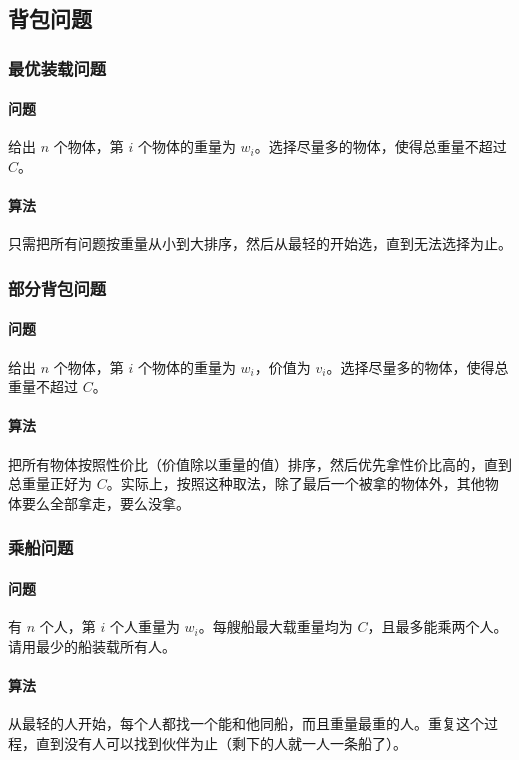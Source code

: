 \subsection{背包问题}

\subsubsection{最优装载问题}
	\paragraph{问题} 给出 $n$ 个物体，第 $i$ 个物体的重量为 $w_i$。选择尽量多的物体，使得总重量不超过 $C$。

	\paragraph{算法} 只需把所有问题按重量从小到大排序，然后从最轻的开始选，直到无法选择为止。

\subsubsection{部分背包问题}
	\paragraph{问题} 给出 $n$ 个物体，第 $i$ 个物体的重量为 $w_i$，价值为 $v_i$。选择尽量多的物体，使得总重量不超过 $C$。

	\paragraph{算法} 把所有物体按照性价比（价值除以重量的值）排序，然后优先拿性价比高的，直到总重量正好为 $C$。实际上，按照这种取法，除了最后一个被拿的物体外，其他物体要么全部拿走，要么没拿。

\subsubsection{乘船问题}
	\paragraph{问题} 有 $n$ 个人，第 $i$ 个人重量为 $w_i$。每艘船最大载重量均为 $C$，且最多能乘两个人。请用最少的船装载所有人。

	\paragraph{算法} 从最轻的人开始，每个人都找一个能和他同船，而且重量最重的人。重复这个过程，直到没有人可以找到伙伴为止（剩下的人就一人一条船了）。
